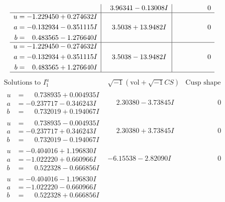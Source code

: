 \documentclass[1p]{elsarticle_modified}
\theoremstyle{definition}
\newcommand{\I}{\sqrt{-1}}
\begin{document}
$$\begin{array}{c|c|c}
 & \phantom{-}3.96341 - 0.13008 I & \phantom{-0.000000 } 0 \\ \hline\begin{aligned}
u &= -1.229450 + 0.274632 I \\
a &= -0.132934 - 0.351115 I \\
b &= \phantom{-}0.483565 - 1.276640 I\end{aligned}
 & \phantom{-}3.5038 + 13.9482 I & \phantom{-0.000000 } 0 \\ \hline\begin{aligned}
u &= -1.229450 - 0.274632 I \\
a &= -0.132934 + 0.351115 I \\
b &= \phantom{-}0.483565 + 1.276640 I\end{aligned}
 & \phantom{-}3.5038 - 13.9482 I & \phantom{-0.000000 } 0\\
 \hline 
 \end{array}$$\newpage$$\begin{array}{c|c|c}  
\text{Solutions to }I^u_{1}& \I (\text{vol} + \sqrt{-1}CS) & \text{Cusp shape}\\
 \hline 
\begin{aligned}
u &= \phantom{-}0.738935 + 0.004935 I \\
a &= -0.237717 - 0.346243 I \\
b &= \phantom{-}0.732019 + 0.194067 I\end{aligned}
 & \phantom{-}2.30380 - 3.73845 I & \phantom{-0.000000 } 0 \\ \hline\begin{aligned}
u &= \phantom{-}0.738935 - 0.004935 I \\
a &= -0.237717 + 0.346243 I \\
b &= \phantom{-}0.732019 - 0.194067 I\end{aligned}
 & \phantom{-}2.30380 + 3.73845 I & \phantom{-0.000000 } 0 \\ \hline\begin{aligned}
u &= -0.404016 + 1.196830 I \\
a &= -1.022220 + 0.660966 I \\
b &= \phantom{-}0.522328 - 0.666856 I\end{aligned}
 & -6.15538 - 2.82090 I & \phantom{-0.000000 } 0 \\ \hline\begin{aligned}
u &= -0.404016 - 1.196830 I \\
a &= -1.022220 - 0.660966 I \\
b &= \phantom{-}0.522328 + 0.666856 I\end{aligned}

\end{array}$$
\end{document}
